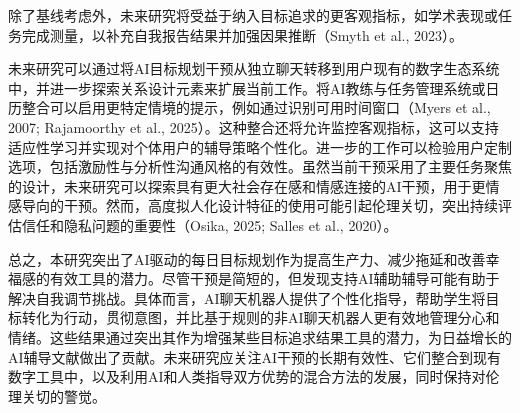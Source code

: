 \par 除了基线考虑外，未来研究将受益于纳入目标追求的更客观指标，如学术表现或任务完成测量，以补充自我报告结果并加强因果推断（Smyth et al., 2023）。

\par 未来研究可以通过将AI目标规划干预从独立聊天转移到用户现有的数字生态系统中，并进一步探索关系设计元素来扩展当前工作。将AI教练与任务管理系统或日历整合可以启用更特定情境的提示，例如通过识别可用时间窗口（Myers et al., 2007; Rajamoorthy et al., 2025）。这种整合还将允许监控客观指标，这可以支持适应性学习并实现对个体用户的辅导策略个性化。进一步的工作可以检验用户定制选项，包括激励性与分析性沟通风格的有效性。虽然当前干预采用了主要任务聚焦的设计，未来研究可以探索具有更大社会存在感和情感连接的AI干预，用于更情感导向的干预。然而，高度拟人化设计特征的使用可能引起伦理关切，突出持续评估信任和隐私问题的重要性（Osika, 2025; Salles et al., 2020）。

\par 总之，本研究突出了AI驱动的每日目标规划作为提高生产力、减少拖延和改善幸福感的有效工具的潜力。尽管干预是简短的，但发现支持AI辅助辅导可能有助于解决自我调节挑战。具体而言，AI聊天机器人提供了个性化指导，帮助学生将目标转化为行动，贯彻意图，并比基于规则的非AI聊天机器人更有效地管理分心和情绪。这些结果通过突出其作为增强某些目标追求结果工具的潜力，为日益增长的AI辅导文献做出了贡献。未来研究应关注AI干预的长期有效性、它们整合到现有数字工具中，以及利用AI和人类指导双方优势的混合方法的发展，同时保持对伦理关切的警觉。

\begingroup
    \printbibliography[title={外文翻译参考文献}]
\endgroup
